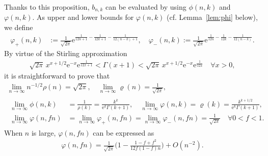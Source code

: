 \documentclass[aop]{imsart}
\theoremstyle{plain}
\theoremstyle{remark}
\newcommand{\rme}{\mathrm{e}}
\newcommand{\1}{\operatorname{\uppercase\expandafter{\romannumeral1}}}
\newcommand{\2}{\operatorname{\uppercase\expandafter{\romannumeral2}}}
\newcommand{\3}{\operatorname{\uppercase\expandafter{\romannumeral3}}}
\newcommand{\4}{\operatorname{\uppercase\expandafter{\romannumeral4}}}
\newcommand{\5}{\operatorname{\uppercase\expandafter{\romannumeral5}}}
\newcommand{\6}{\operatorname{\uppercase\expandafter{\romannumeral6}}}
\newcommand{\7}{\operatorname{\uppercase\expandafter{\romannumeral7}}}
\newcommand{\8}{\operatorname{\uppercase\expandafter{\romannumeral8}}}
\newcommand{\9}{\operatorname{\uppercase\expandafter{\romannumeral9}}}
\newcommand{\lref}[1]{Lemma~\ref{#1}}
\begin{document}
Thanks to this proposition, $b_{n,k}$ can be evaluated by using 
$\phi(n,k)$ and $\varphi(n,k)$.
As upper and lower bounds for $\varphi(n,k)$ (cf. \lref{lem:phi} below), we define 
\begin{align}
\varphi_+(n,k)&:=\frac{1}{\sqrt{2\pi}}\rme^{\frac{1}{12n+1}-\frac{1}{12k+1}-\frac{1}{12(n-k)+1}},\quad \varphi_-(n,k):=\frac{1}{\sqrt{2\pi}}\rme^{\frac{1}{12n}-\frac{1}{12k}-\frac{1}{12(n-k)}}. \label{eq:varphipm(nk)}
\end{align}
By virtue of the Stirling approximation \cite{Robb55,Mort10}
\begin{align}\label{eq:Stirling}
\sqrt{2\pi}\,x^{x+1/2}\rme^{-x}\rme^{\frac{1}{12x+1}}< \Gamma(x+1)< \sqrt{2\pi}\,x^{x+1/2}\rme^{-x}  \rme^{\frac{1}{12x}}\quad \forall x>0,
\end{align}
it is straightforward to prove that
\begin{gather}
\lim_{n\to \infty}n^{-1/2}\rho(n)=\sqrt{2\pi},\quad \lim_{n\to\infty}\varrho(n)=\frac{1}{\sqrt{2\pi}}, \label{eq:rhoLim} \\ 
\begin{split}
\lim_{n\to\infty}\phi(n,k)&=\frac{1}{\rho(k)}=\frac{k^k}{\rme^k\Gamma(k+1)},\quad 
\lim_{n\to\infty}\varphi(n,k)=\varrho(k)=\frac{k^{k+1/2}}{\rme^k\Gamma(k+1)}, \\
\lim_{n\to\infty} \varphi(n,fn)&=\lim_{n\to\infty} \varphi_+(n,fn)=\lim_{n\to\infty} \varphi_-(n,fn)=\frac{1}{\sqrt{2\pi}}\quad \forall 0<f<1. \label{eq:philim}
\end{split}
\end{gather}
When $n$ is large, $\varphi(n,fn)$ can be expressed as 
\begin{align}
\varphi(n,fn)=\frac{1}{\sqrt{2\pi}}\biggl(1-\frac{1-f+f^2}{12f(1-f)n}\biggr)+O(n^{-2}). 
\end{align}
\end{document}

